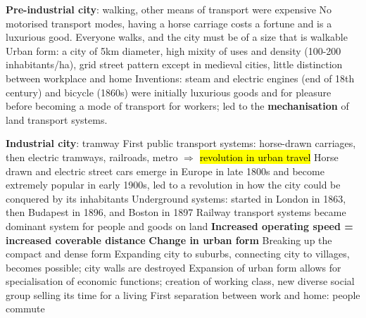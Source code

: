 \documentclass{article}
\begin{document}
\begin{outline}
	\1 \textbf{Pre-industrial city}: walking, other means of transport were expensive
		\2 No motorised transport modes, having a horse carriage costs a fortune and is a luxurious good. Everyone walks, and the city must be of a size that is walkable
		\2 Urban form: a city of 5km diameter, high mixity of uses and density (100-200 inhabitants/ha), grid street pattern except in medieval cities, little distinction between workplace and home
		\2 Inventions: steam and electric engines (end of 18th century) and bicycle (1860s) were initially luxurious goods and for pleasure before becoming a mode of transport for workers; led to the \textbf{mechanisation} of land transport systems. 
		
	\1 \textbf{Industrial city}: tramway
		\2 First public transport systems: horse-drawn carriages, then electric tramways, railroads, metro $\Rightarrow$ \hl{revolution in urban travel}
			\3 Horse drawn and electric street cars emerge in Europe in late 1800s and become extremely popular in early 1900s, led to a revolution in how the city could be conquered by its inhabitants
			\3 Underground systems: started in London in 1863, then Budapest in 1896, and Boston in 1897
			\3 Railway transport systems became dominant system for people and goods on land
			\3 \textbf{Increased operating speed = increased coverable distance}
		\2 \textbf{Change in urban form}
			\3 Breaking up the compact and dense form
			\3 Expanding city to suburbs, connecting city to villages, becomes possible; city walls are destroyed
			\3 Expansion of urban form allows for specialisation of economic functions; creation of working class, new diverse social group selling its time for a living
			\3 First separation between work and home: people commute


\end{outline}
\end{document}
